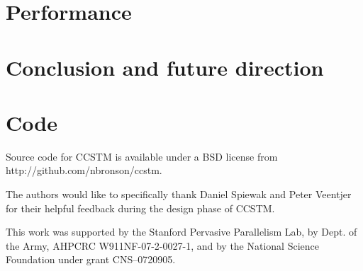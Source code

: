 \documentclass[preprint]{sigplanconf}
\begin{document}



%

\section{Performance}
\label{sec:perf}


\section{Conclusion and future direction}
\label{sec:conclusion}


\appendix
\section{Code}

Source code for CCSTM is available under a BSD license from
\textsf{http://github.com/nbronson/ccstm}.


\acks

The authors would like to specifically thank Daniel Spiewak and Peter
Veentjer for their helpful feedback during the design phase of CCSTM.

This work was supported by the Stanford Pervasive Parallelism Lab,
by Dept. of the Army, AHPCRC W911NF-07-2-0027-1, and by
the National Science Foundation under grant CNS--0720905.

{

%


}
\end{document}
